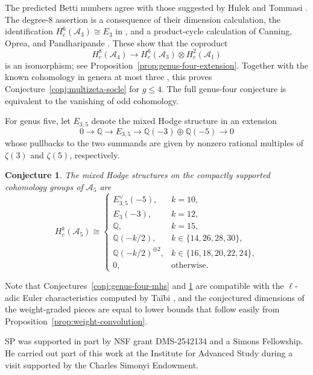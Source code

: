 \documentclass[12 pt]{amsart}
\newcommand{\QQ}{\mathbb{Q}}
\newcommand{\cA}{\mathcal{A}}
\newcommand{\<}{\langle}
\renewcommand{\>}{\rangle}
\newtheorem{conjecture}[theorem]{Conjecture}
\theoremstyle{definition}
\begin{document}
\noindent The predicted Betti numbers agree with those suggested by Hulek and Tommasi \cite{HulekTommasiA4}. The degree-$8$ assertion is a consequence of their dimension calculation, the identification $H_c^6(\cA_3) \cong E_3$ in \cite[Theorem~1.19]{BCGP}, and a product-cycle calculation of Canning, Oprea, and Pandharipande \cite{COP}. These show that the coproduct
\[
H_c^8(\cA_4) \longrightarrow H_c^6(\cA_3) \otimes H_c^2(\cA_1)
\]
is an isomorphism; see Proposition~\ref{prop:genus-four-extension}. Together with the known cohomology in genera at most three \cite{HainA3,BCGP}, this proves Conjecture~\ref{conj:multizeta-socle} for $g \leq 4$. The full genus-four conjecture is equivalent to the vanishing of odd cohomology.

For genus five, let $E_{3, 5}$ denote the mixed Hodge structure in an extension
\[
0 \longrightarrow \QQ \longrightarrow E_{3, 5} \longrightarrow \QQ(-3) \oplus \QQ(-5) \longrightarrow 0
\]
whose pullbacks to the two summands are given by nonzero rational multiples of $\zeta(3)$ and $\zeta(5)$, respectively.

\begin{conjecture}\label{conj:genus-five-mhs}
The mixed Hodge structures on the compactly supported cohomology groups of $\cA_5$ are
\[
H_c^k(\cA_5) \cong
\begin{cases}
E_{3, 5}^\vee(-5), & k = 10,\\
E_3(-3), & k = 12,\\
\QQ, & k = 15,\\
\QQ(-k/2), & k \in \{14, 26, 28, 30\},\\
\QQ(-k/2)^{ \oplus 2}, & k \in \{16, 18, 20, 22, 24\},\\
0, & \text{otherwise}.
\end{cases}
\]
\end{conjecture}

Note that Conjectures~\ref{conj:genus-four-mhs} and \ref{conj:genus-five-mhs} are compatible with the $\ell$-adic Euler characteristics computed by Ta\"ibi \cite[Theorem~1]{TaibiEuler}, and the conjectured dimensions of the weight-graded pieces are equal to lower bounds that follow easily from Proposition~\ref{prop:weight-convolution}.


\medskip

\enlargethispage{\baselineskip}
 SP was supported in part by NSF grant DMS-2542134 and a Simons Fellowship. He carried out part of this work at the Institute for Advanced Study during a visit supported by the Charles Simonyi Endowment. 
\end{document}
